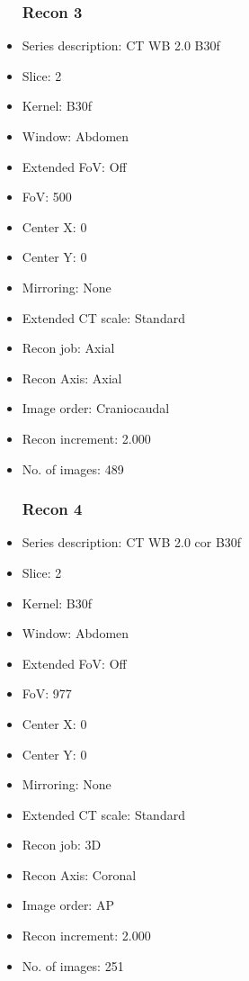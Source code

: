 \documentclass[12pt]{article}
\begin{document}
\begin{itemize}
\subsubsection{Recon 3}
\item Series description: CT WB 2.0 B30f
\item Slice: 2
\item Kernel: B30f
\item Window: Abdomen
\item Extended FoV: Off
\item FoV: 500
\item Center X: 0
\item Center Y: 0
\item Mirroring: None
\item Extended CT scale: Standard
\item Recon job: Axial
\item Recon Axis: Axial
\item Image order: Craniocaudal
\item Recon increment: 2.000
\item No. of images: 489
\subsubsection{Recon 4}
\item Series description: CT WB 2.0 cor B30f
\item Slice: 2
\item Kernel: B30f
\item Window: Abdomen
\item Extended FoV: Off
\item FoV: 977
\item Center X: 0
\item Center Y: 0
\item Mirroring: None
\item Extended CT scale: Standard
\item Recon job: 3D
\item Recon Axis: Coronal
\item Image order: AP
\item Recon increment: 2.000
\item No. of images: 251

\end{itemize}
\end{document}
